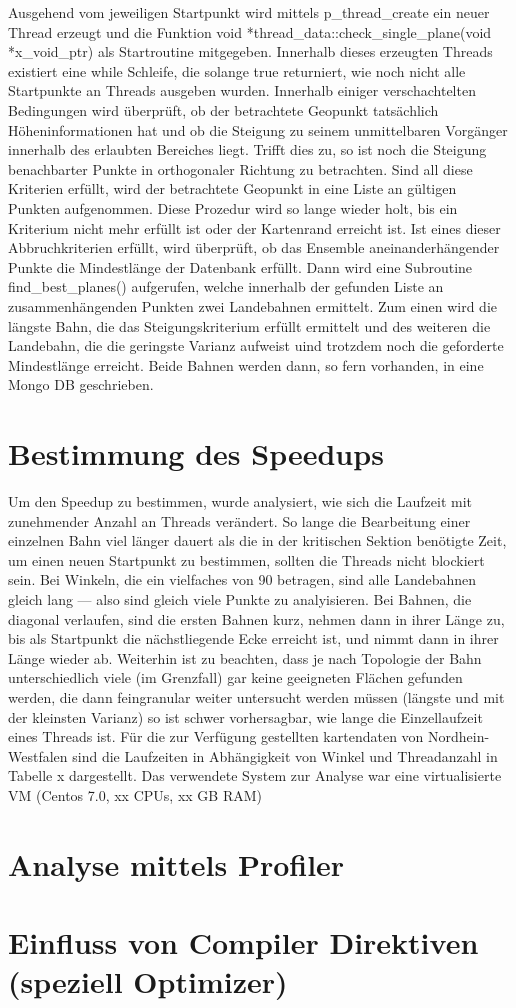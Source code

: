 \documentclass[10pt,a4paper]{report}
\begin{document}
Ausgehend vom jeweiligen Startpunkt wird mittels p\_thread\_create ein neuer Thread erzeugt und die Funktion void *thread\_data::check\_single\_plane(void *x\_void\_ptr) als Startroutine mitgegeben. Innerhalb dieses erzeugten Threads existiert eine while Schleife, die solange true returniert, wie noch nicht alle Startpunkte an Threads ausgeben wurden.
Innerhalb einiger verschachtelten Bedingungen wird überprüft, ob der betrachtete Geopunkt tatsächlich Höheninformationen hat und ob die Steigung zu seinem unmittelbaren Vorgänger innerhalb des erlaubten Bereiches liegt.
Trifft dies zu, so ist noch die Steigung benachbarter Punkte in orthogonaler Richtung zu betrachten. Sind all diese Kriterien erfüllt, wird der betrachtete Geopunkt in eine Liste an gültigen Punkten aufgenommen. Diese Prozedur wird so lange wieder holt, bis ein Kriterium nicht mehr erfüllt ist oder der Kartenrand erreicht ist.
Ist eines dieser Abbruchkriterien erfüllt, wird überprüft, ob das Ensemble aneinanderhängender Punkte die Mindestlänge der Datenbank erfüllt.
Dann wird eine Subroutine find\_best\_planes() aufgerufen, welche innerhalb der gefunden Liste an zusammenhängenden Punkten zwei Landebahnen ermittelt. Zum einen wird die längste Bahn, die das Steigungskriterium erfüllt ermittelt und des weiteren die Landebahn, die die geringste Varianz aufweist uind trotzdem noch die geforderte Mindestlänge erreicht. 
Beide Bahnen werden dann, so fern vorhanden, in eine Mongo DB geschrieben.

\section{Bestimmung des Speedups}

Um den Speedup zu bestimmen, wurde analysiert, wie sich die Laufzeit mit zunehmender Anzahl an Threads verändert. So lange die Bearbeitung einer einzelnen Bahn viel länger dauert als die in der kritischen Sektion benötigte Zeit, um einen neuen Startpunkt zu bestimmen, sollten die Threads nicht blockiert sein.
Bei Winkeln, die ein vielfaches von 90\° betragen, sind alle Landebahnen gleich lang --- also sind gleich viele Punkte zu analyisieren.
Bei Bahnen, die diagonal verlaufen, sind die ersten Bahnen kurz, nehmen dann in ihrer Länge zu, bis als Startpunkt die nächstliegende Ecke  erreicht ist, und nimmt dann in ihrer Länge wieder ab. Weiterhin ist zu beachten, dass je nach Topologie der Bahn unterschiedlich viele (im Grenzfall) gar keine geeigneten Flächen gefunden werden, die dann feingranular weiter untersucht werden müssen (längste und mit der kleinsten Varianz) so ist schwer vorhersagbar, wie lange die Einzellaufzeit eines Threads ist.
Für die zur Verfügung gestellten kartendaten von Nordhein-Westfalen sind die Laufzeiten in Abhängigkeit von Winkel und Threadanzahl in Tabelle x dargestellt. Das verwendete System zur Analyse war eine virtualisierte VM (Centos 7.0, xx CPUs, xx GB RAM) 

\section{Analyse mittels Profiler}

\section{Einfluss von Compiler Direktiven (speziell Optimizer)}
\end{document}
